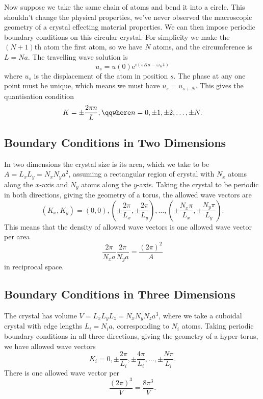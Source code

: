 \documentclass[fleqn]{NotesClass}
\newcommand*{\e}{\mathrm{e}}
\begin{document}
    Now suppose we take the same chain of atoms and bend it into a circle.
    This shouldn't change the physical properties, we've never observed the macroscopic geometry of a crystal effecting material properties.
    We can then impose periodic boundary conditions on this circular crystal.
    For simplicity we make the \((N + 1)\)th atom the first atom, so we have \(N\) atoms, and the circumference is \(L = Na\).
    The travelling wave solution is
    \begin{equation}
        u_s = u(0)\e^{i(sKa - \omega_Kt)}
    \end{equation}
    where \(u_s\) is the displacement of the atom in position \(s\).
    The phase at any one point must be unique, which means we must have \(u_s = u_{s + N}\).
    This gives the quantisation condition
    \begin{equation}
        K = \pm\frac{2\pi n}{L}, \qqwhere n = 0, \pm 1, \pm 2, \dotsc, \pm N.
    \end{equation}
    
    \subsection{Boundary Conditions in Two Dimensions}
    In two dimensions the crystal size is its area, which we take to be \(A = L_xL_y = N_xN_ya^2\), assuming a rectangular region of crystal with \(N_x\) atoms along the \(x\)-axis and \(N_y\) atoms along the \(y\)-axis.
    Taking the crystal to be periodic in both directions, giving the geometry of a torus, the allowed wave vectors are
    \begin{equation}
        (K_x, K_y) = (0, 0), \left( \pm \frac{2\pi}{L_x}, \pm \frac{2\pi}{L_y} \right), \dotsc, \left( \pm\frac{N_x\pi}{L_x}, \pm\frac{N_y\pi}{L_y} \right).
    \end{equation}
    This means that the density of allowed wave vectors is one allowed wave vector per area
    \begin{equation}
        \frac{2\pi}{N_xa}\frac{2\pi}{N_ya} = \frac{(2\pi)^2}{A}
    \end{equation}
    in reciprocal space.
    
    \subsection{Boundary Conditions in Three Dimensions}
    The crystal has volume \(V = L_xL_yL_z = N_xN_yN_za^3\), where we take a cuboidal crystal with edge lengths \(L_i = N_ia\), corresponding to \(N_i\) atoms.
    Taking periodic boundary conditions in all three directions, giving the geometry of a hyper-torus, we have allowed wave vectors
    \begin{equation}
        K_i = 0, \pm \frac{2\pi}{L_i}, \pm \frac{4\pi}{L_i}, \dotsc, \pm \frac{N\pi}{L_i}.
    \end{equation}
    There is one allowed wave vector per
    \begin{equation}
        \frac{(2\pi)^3}{V} = \frac{8\pi^3}{V}.
    \end{equation}
    
\end{document}
